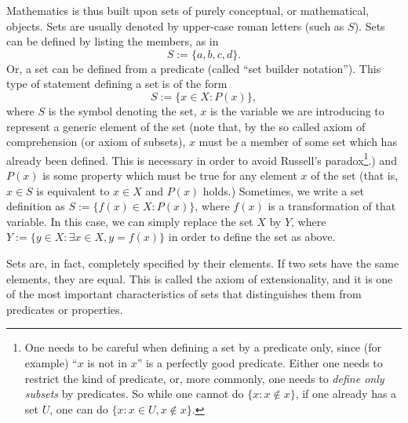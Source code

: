 \documentclass[12pt]{article}
\begin{document}
Mathematics is thus built upon sets of purely conceptual, or mathematical, objects. Sets are usually denoted by upper-case roman letters (such as $S$). Sets can be defined by listing the members, as in
\[ S := \{ a, b, c, d\}. \]
Or, a set can be defined from a predicate (called ``set builder notation''). This type of statement defining a set is of the form
\[ S := \{ x \in X : P(x) \},\]
where $S$ is the symbol denoting the set, $x$ is the variable we are introducing to represent a generic element of the set (note that, by the so called axiom of comprehension (or axiom of subsets), $x$ must be a member of some set which has already been defined. This is necessary in order to avoid Russell's paradox\footnote{One needs to be careful when defining a set by a predicate only, since (for example) ``$x$ is not in $x$'' is a perfectly good predicate. Either one needs to restrict the kind of predicate, or, more commonly, one needs to \emph{define only subsets} by predicates. So while one cannot do $\{x \colon x \not\in x\}$, if one already has a set $U$, one can do $\{x: x \in U, x \not\in x\}$.}.) and $P(x)$ is some property which must be true for any element $x$ of the set (that is, $x\in S$ is equivalent to $x\in X$ and $P(x)$ holds.) Sometimes, we write a set definition as $S := \{ f(x) \in X : P(x) \}$, where $f(x)$ is a transformation of that variable. In this case, we can simply replace the set $X$ by $Y$, where $Y := \{ y \in X : \exists x\in X, y = f(x) \}$ in order to define the set as above.

Sets are, in fact, completely specified by their elements. If two sets have the same elements, they are equal. This is called the axiom of extensionality, and it is one of the most important characteristics of sets that distinguishes them from predicates or properties.


\end{document}

